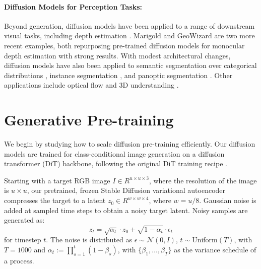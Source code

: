 \documentclass[manuscript,screen,review]{acmart}
\begin{document}
\paragraph{\textbf{Diffusion Models for Perception Tasks: }}
 Beyond generation, diffusion models have been applied to a range of downstream
visual tasks, including depth estimation \citep{ji2023ddp,duan2023diffusiondepth,saxena2023monocular,saxena2024surprising,zhao2023unleashing}. Marigold \citep{ke2024repurposing} and GeoWizard \citep{fu2024geowizard}
are two more recent examples, both repurposing pre-trained diffusion models for monocular depth
estimation with strong results. With modest architectural changes, diffusion models have also been
applied to semantic segmentation over categorical
distributions \citep{hoogeboom2021argmax,brempong2022denoising,tan2022semantic,amit2021segdiff,baranchuk2021label,wolleb2022diffusion}, instance segmentation \citep{gu2024diffusioninst}, and panoptic
segmentation \citep{chen2023generalist}. Other applications include optical flow \citep{luo2024flowdiffuser,saxena2024surprising} and 3D understanding \citep{liu2023zero,jain2022zero,poole2022dreamfusion,wang2023score,watson2022novel}.

\section{Generative Pre-training}
We begin by studying how to scale diffusion pre-training efficiently. Our diffusion models are
trained for class-conditional image generation on a diffusion transformer (DiT) backbone, following
the original DiT training recipe \citep{peebles2023scalable}.

Starting with a target RGB image $I \in R^{u×u×3}$, where the resolution of the image is $u × u$, our
pretrained, frozen Stable Diffusion variational autoencoder \citep{rombach2022high} compresses the
target to a latent $z_0 \in R^{w× w× 4}$, where $w = u/8$. Gaussian noise is added at sampled time steps to obtain a noisy target latent. Noisy samples are generated as:
   \begin{equation}
       z_t=\sqrt{\alpha_t}\cdot z_0 + \sqrt{1-\alpha_t}\cdot\epsilon_t
   \end{equation}
for timestep $t$. The noise is distributed as 
$\epsilon \sim \mathcal{N}(0, I)$, $t \sim \text{Uniform}(T)$, 
with $T = 1000$ and
$\alpha_t := \prod_{s=1}^{t}(1 - \beta_s)$, 
with $\{\beta_1, \ldots, \beta_T\}$ as the variance schedule of a process.
\end{document}
